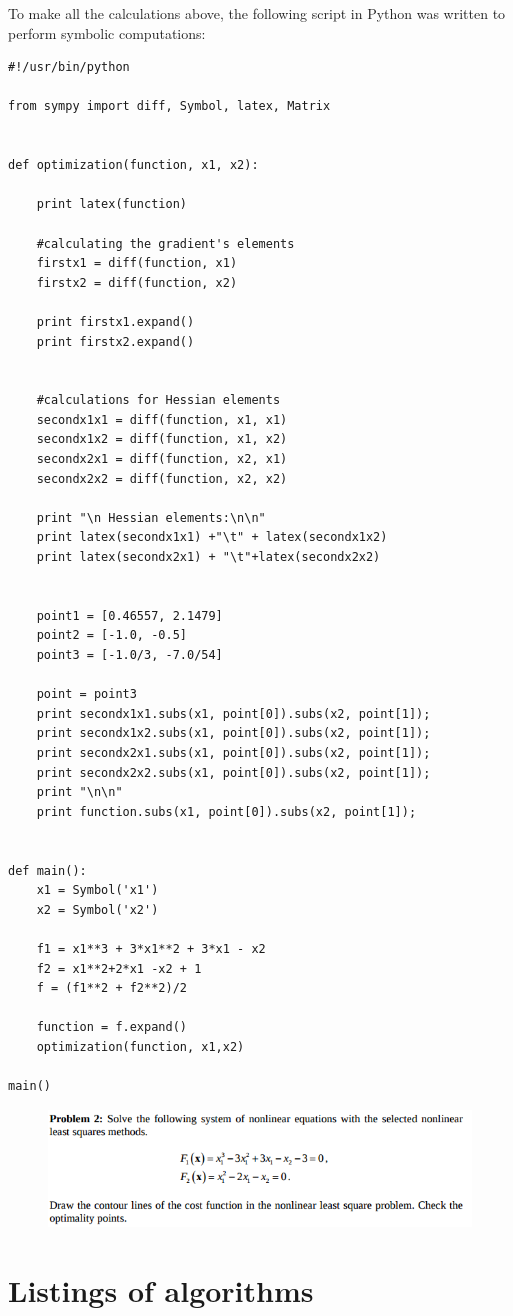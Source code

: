 \documentclass[eng,openany]{mgr}
\begin{document}
To make all the calculations above, the following script in Python was written to perform symbolic computations:
\newpage
\begin{lstlisting}
#!/usr/bin/python

from sympy import diff, Symbol, latex, Matrix


def optimization(function, x1, x2):

	print latex(function)
	
	#calculating the gradient's elements
	firstx1 = diff(function, x1)
	firstx2 = diff(function, x2)
	
	print firstx1.expand()
	print firstx2.expand()
	
	
	#calculations for Hessian elements
	secondx1x1 = diff(function, x1, x1)
	secondx1x2 = diff(function, x1, x2)
	secondx2x1 = diff(function, x2, x1)
	secondx2x2 = diff(function, x2, x2)
	
	print "\n Hessian elements:\n\n"
	print latex(secondx1x1) +"\t" + latex(secondx1x2)
	print latex(secondx2x1) + "\t"+latex(secondx2x2)
	
	
	point1 = [0.46557, 2.1479]
	point2 = [-1.0, -0.5]
	point3 = [-1.0/3, -7.0/54]
	
	point = point3
	print secondx1x1.subs(x1, point[0]).subs(x2, point[1]);
	print secondx1x2.subs(x1, point[0]).subs(x2, point[1]);
	print secondx2x1.subs(x1, point[0]).subs(x2, point[1]);
	print secondx2x2.subs(x1, point[0]).subs(x2, point[1]);
	print "\n\n"
	print function.subs(x1, point[0]).subs(x2, point[1]);	


def main():
	x1 = Symbol('x1')
	x2 = Symbol('x2')
	
	f1 = x1**3 + 3*x1**2 + 3*x1 - x2
	f2 = x1**2+2*x1 -x2 + 1
	f = (f1**2 + f2**2)/2	
	
	function = f.expand()
	optimization(function, x1,x2)

main()
\end{lstlisting}
\newpage

\begin{figure}[h]
\centering
\includegraphics[width=0.7\linewidth]{screenshot003}
\label{fig:screenshot003}
\end{figure}

\clearpage
\chapter{Listings of algorithms}
\end{document}
